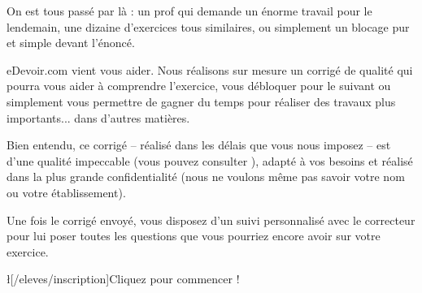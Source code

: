 On est tous passé par là : un prof qui demande un énorme travail pour le lendemain, une dizaine d'exercices tous similaires, ou simplement un blocage pur et simple devant l'énoncé.

eDevoir.com vient vous aider. Nous réalisons sur mesure un corrigé de qualité qui pourra vous aider à comprendre l'exercice, vous débloquer pour le suivant ou simplement vous permettre de gagner du temps pour réaliser des travaux plus importants... dans d'autres matières.

Bien entendu, ce corrigé -- réalisé dans les délais que vous nous imposez -- est d'une qualité impeccable (vous pouvez consulter ), adapté à vos besoins et réalisé dans la plus grande confidentialité (nous ne voulons même pas savoir votre nom ou votre établissement).

Une fois le corrigé envoyé, vous disposez d'un suivi personnalisé avec le correcteur pour lui poser toutes les questions que vous pourriez encore avoir sur votre exercice.

\l[/eleves/inscription]{Cliquez pour commencer !}
